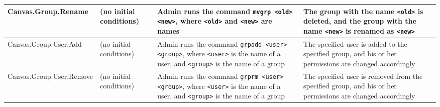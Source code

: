 \documentclass[11pt,oneside,a4paper]{article}
\begin{document}
\begin{center}
\begin{tabular}{ | l | p{3cm} | p{3cm} | p{3cm} | }
\tiny{Canvas.Group.Rename}				& \tiny{(no initial conditions)}					& \tiny{Admin runs the command \verb|mvgrp <old> <new>|, where \verb|<old>| and \verb|<new>| are names}														& \tiny{The group with the name \verb|<old>| is deleted, and the group with the name \verb|<new>| is renamed as \verb|<new>|} \\\hline
\tiny{Canvas.Group.User.Add}			& \tiny{(no initial conditions)}					& \tiny{Admin runs the command \verb|grpadd <user> <group>|, where \verb|<user>| is the name of a user, and \verb|<group>| is the name of a group}			& \tiny{The specified user is added to the specified group, and his or her permissions are changed accordingly} \\\hline
\tiny{Canvas.Group.User.Remove}			& \tiny{(no initial conditions)}					& \tiny{Admin runs the command \verb|grprm <user> <group>|, where \verb|<user>| is the name of a user, and \verb|<group>| is the name of a group}			& \tiny{The specified user is removed from the specified group, and his or her permissions are changed accordingly} \\\hline
\end{tabular}
\end{center}
\end{document}
